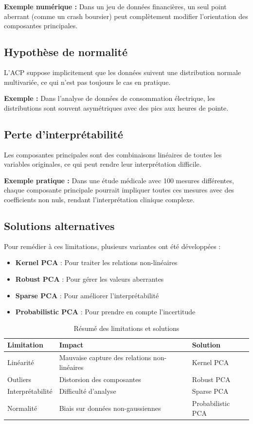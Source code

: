 \documentclass[a4paper,12pt]{report}
\begin{document}
\textbf{Exemple numérique :} Dans un jeu de données financières, un seul point aberrant (comme un crash boursier) peut complètement modifier l'orientation des composantes principales.

\subsection{Hypothèse de normalité}
L'ACP suppose implicitement que les données suivent une distribution normale multivariée, ce qui n'est pas toujours le cas en pratique.

\textbf{Exemple :} Dans l'analyse de données de consommation électrique, les distributions sont souvent asymétriques avec des pics aux heures de pointe.

\subsection{Perte d'interprétabilité}
Les composantes principales sont des combinaisons linéaires de toutes les variables originales, ce qui peut rendre leur interprétation difficile.

\textbf{Exemple pratique :}
Dans une étude médicale avec 100 mesures différentes, chaque composante principale pourrait impliquer toutes ces mesures avec des coefficients non nuls, rendant l'interprétation clinique complexe.

\subsection{Solutions alternatives}
Pour remédier à ces limitations, plusieurs variantes ont été développées :

\begin{itemize}
  \item \textbf{Kernel PCA} : Pour traiter les relations non-linéaires
  \item \textbf{Robust PCA} : Pour gérer les valeurs aberrantes
  \item \textbf{Sparse PCA} : Pour améliorer l'interprétabilité
  \item \textbf{Probabilistic PCA} : Pour prendre en compte l'incertitude
\end{itemize}

\begin{table}[H]
  \centering
  \begin{tabular}{|l|l|l|}
    \hline
    \textbf{Limitation} & \textbf{Impact} & \textbf{Solution} \\
    \hline
    Linéarité & Mauvaise capture des relations non-linéaires & Kernel PCA \\
    Outliers & Distorsion des composantes & Robust PCA \\
    Interprétabilité & Difficulté d'analyse & Sparse PCA \\
    Normalité & Biais sur données non-gaussiennes & Probabilistic PCA \\
    \hline
  \end{tabular}
  \caption{Résumé des limitations et solutions}
\end{table}
\end{document}
